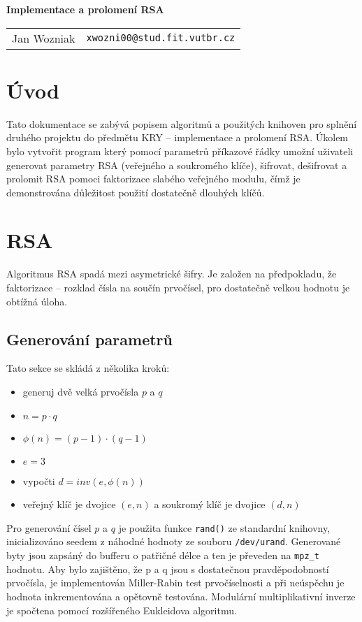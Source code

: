 \documentclass[a4paper,11pt]{article}
\begin{document}
\begin{center}{\LARGE\textbf{Implementace a prolomení RSA}}\\[0.2cm]
\newcommand{\autor}[2]{#1&\texttt{#2@stud.fit.vutbr.cz}\tabularnewline}
\begin{tabular}{ll}
    \autor{Jan Wozniak}{xwozni00}
\end{tabular}
\end{center}


\section{Úvod}
Tato dokumentace se zabývá popisem algoritmů a použitých knihoven pro splnění druhého projektu
do předmětu KRY -- implementace a prolomení RSA. Úkolem bylo vytvořit program který pomocí
parametrů příkazové řádky umožní uživateli generovat parametry RSA (veřejného a soukromého
klíče), šifrovat, dešifrovat a prolomit RSA pomoci faktorizace slabého veřejného modulu, čímž
je demonstrována důležitost použití dostatečně dlouhých klíčů.

\section{RSA}
Algoritmus RSA spadá mezi asymetrické šifry. Je založen na předpokladu, že faktorizace --
rozklad čísla na součín prvočísel, pro dostatečně velkou hodnotu je obtížná úloha.
\subsection*{Generování parametrů}
Tato sekce se skládá z několika kroků:
\begin{itemize}
\item generuj dvě velká prvočísla $p$ a $q$
\item $n = p \cdot q$
\item $\phi(n) = (p-1) \cdot (q-1)$
\item $e = 3$
\item vypočti $d = inv(e, \phi(n))$
\item veřejný klíč je dvojice $(e,n)$ a soukromý klíč je dvojice $(d,n)$
\end{itemize}

Pro generování čísel $p$ a $q$ je použita funkce \texttt{rand()} ze standardní knihovny, 
inicializováno seedem z náhodné hodnoty ze souboru \texttt{/dev/urand}. Generované byty
jsou zapsáný do bufferu o patřičné délce a ten je převeden na \texttt{mpz\_t} hodnotu.
Aby bylo zajištěno, že p a q jsou s dostatečnou pravděpodobností prvočísla, je implementován
Miller-Rabin test prvočíselnosti a při neúspěchu je hodnota inkrementována a opětovně testována.
Modulární multiplikativní inverze je spočtena pomocí rozšířeného Eukleidova algoritmu.
\end{document}

